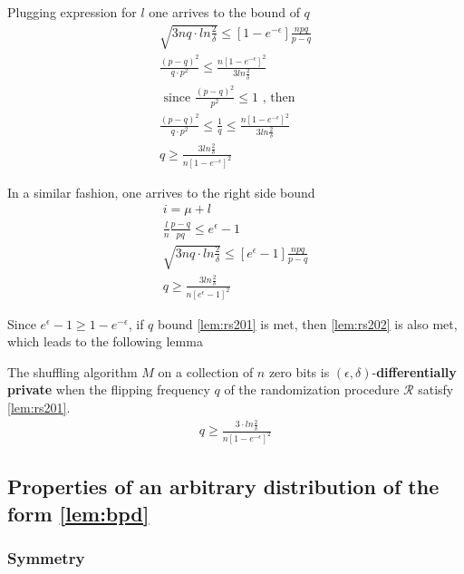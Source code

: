 \documentclass[11pt]{article}
\newcommand{\cR}{\mathcal{R}}
\begin{document}
Plugging expression for $l$ one arrives to the bound of $q$
\begin{align}
\sqrt{3nq \cdot ln\frac{2}{\delta}} \le \left [ 1 - e^{-\epsilon}\right ] \frac { npq}{p - q} \\
 \frac {(p - q)^2} {q \cdot p^2} \le   \frac { n \left [ 1 - e^{-\epsilon}\right ]^2 } { 3  ln\frac{2}{\delta}}  \\
 \text{ since }  \frac {(p - q)^2} { p^2} \le 1 \text{ , then }  \\
  \frac {(p - q)^2} {q \cdot p^2} \le \frac{1}{q}  \le   \frac { n \left [ 1 - e^{-\epsilon}\right ]^2 } { 3  ln\frac{2}{\delta}}  \\
  q \ge  \frac { 3  ln\frac{2}{\delta}} { n \left [ 1 - e^{-\epsilon}\right ]^2 } \label{lem:rs201}
\end{align}

In a similar fashion, one arrives to the right side bound
\begin{align}
i = \mu + l \\
\frac{l}{n} \frac{p-q}{pq}  \le e^\epsilon - 1 \\
\sqrt{3nq \cdot ln\frac{2}{\delta}} \le \left [ e^\epsilon - 1  \right ] \frac { npq}{p - q} \\
  q \ge  \frac { 3  ln\frac{2}{\delta}} { n \left [ e^{\epsilon} - 1\right ]^2 }  \label{lem:rs202}
\end{align}


Since $e^{\epsilon} - 1 \ge 1 - e^{-\epsilon}$, if $q$ bound  \eqref{lem:rs201} is met, then \eqref{lem:rs202} is also met, which leads to the following lemma

 \begin{lem} \label{lem:rs203}
The shuffling algorithm $M$ on a collection of $n$ zero bits is $(\epsilon,\delta)$-\textbf{differentially private} when the flipping frequency $q$ of the randomization procedure $\cR$ satisfy \eqref{lem:rs201}.
 \begin{align*}
  q \ge  \frac { 3 \cdot ln\frac{2}{\delta}} { n \left [ 1 - e^{-\epsilon}\right ]^2 }
  \end{align*}
\end{lem}

\subsection{Properties of an arbitrary distribution of the form \ref{lem:bpd}}

\subsubsection{Symmetry}
\end{document}
